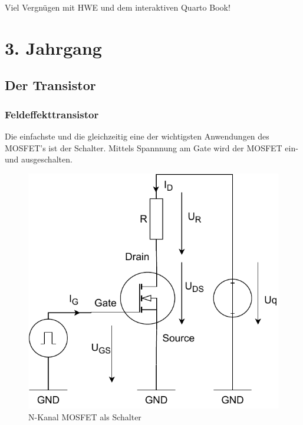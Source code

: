 \documentclass[
  letterpaper,
  DIV=11]{scrreprt}
\begin{document}
Viel Vergnügen mit HWE und dem interaktiven Quarto Book!

\part{3. Jahrgang}

\hypertarget{der-transistor}{%
\chapter{Der Transistor}\label{der-transistor}}

\hypertarget{feldeffekttransistor}{%
\section{Feldeffekttransistor}\label{feldeffekttransistor}}

Die einfachste und die gleichzeitig eine der wichtigsten Anwendungen des
MOSFET's ist der Schalter. Mittels Spannnung am Gate wird der MOSFET
ein- und ausgeschalten.

\begin{figure}

{\centering \includegraphics{Transistoren/Grafiken/NChannelenhancementSwitch.pdf}

}

\caption{\label{fig-n-Channel_switch}N-Kanal MOSFET als Schalter}

\end{figure}
\end{document}
